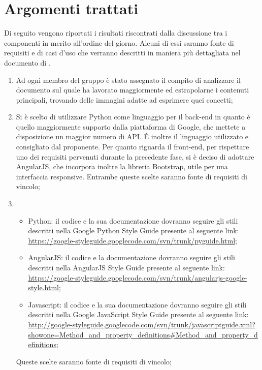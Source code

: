 \section{Argomenti trattati} %
\label{sec:argomenti_trattati}
Di seguito vengono riportati i risultati riscontrati dalla discussione tra i componenti in merito all'ordine del giorno. \newline
Alcuni di essi saranno fonte di requisiti e di casi d'uso che verranno descritti in maniera più dettagliata nel documento di \docNameVersionAdR.
	\begin{enumerate}
		\item Ad ogni membro del gruppo è stato assegnato il compito di analizzare il documento sul quale ha lavorato maggiormente ed estrapolarne i contenuti principali, trovando delle immagini adatte ad esprimere quei concetti;
		\item Si è scelto di utilizzare Python come linguaggio per il back-end in quanto è quello maggiormente supporto dalla piattaforma di Google, che mettete a disposizione un maggior numero di API. \'E inoltre il linguaggio utilizzato e consigliato dal proponente. \newline
		Per quanto riguarda il front-end, per rispettare uno dei requisiti pervenuti durante la precedente fase, si è deciso di adottare AngularJS, che incorpora inoltre la libreria Bootstrap, utile per una interfaccia responsive. \newline
		Entrambe queste scelte saranno fonte di requisiti di vincolo;
		\item
			\begin{itemize}
				\item Python: il codice e la sua documentazione dovranno seguire gli stili descritti nella Google Python Style Guide presente al seguente link: \url{https://google-styleguide.googlecode.com/svn/trunk/pyguide.html};
				\item AngularJS: il codice e la documentazione dovranno seguire gli stili descritti nella AngularJS Style Guide presente al seguente link: \url{https://google-styleguide.googlecode.com/svn/trunk/angularjs-google-style.html};
				\item Javascript: il codice e la sua documentazione dovranno seguire gli stili descritti nella Google JavaScript Style Guide presente al seguente link: \url{http://google-styleguide.googlecode.com/svn/trunk/javascriptguide.xml?showone=Method_and_property_definitions#Method_and_property_definitions};
			\end{itemize}
			\noindent
		Queste scelte saranno fonte di requisiti di vincolo;


\end{enumerate}
